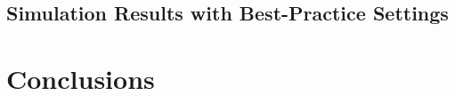 \documentclass[onecolumn,11pt]{report}
\begin{document}



\section{Simulation Results with Best-Practice Settings}

\chapter{Conclusions}
 
\end{document}
